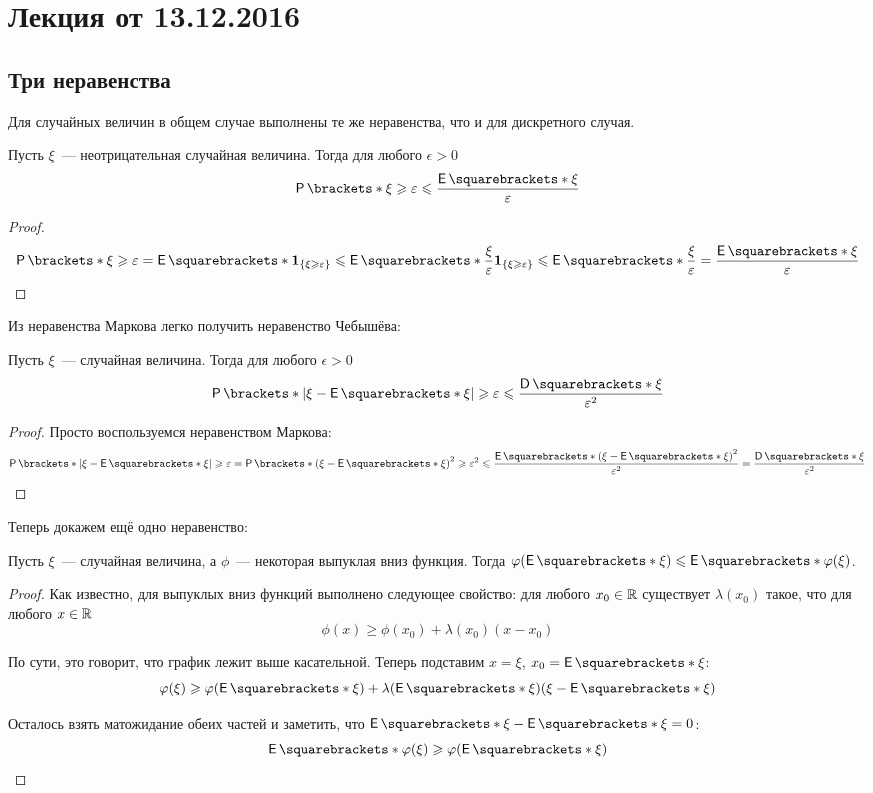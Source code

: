 \section{Лекция от 13.12.2016}
\subsection{Три неравенства}
Для случайных величин в общем случае выполнены те же неравенства, что и для дискретного случая.
\begin{theorem}
	Пусть \(\xi\)~--- неотрицательная случайная величина. Тогда для любого \(\epsilon > 0\)
	\[
		\Pr{\xi \geq \epsilon} \leq \frac{\E{\xi}}{\epsilon}
	\]
\end{theorem}
\begin{proof}
	\[
		\Pr{\xi \geq \epsilon} = \E{\mathbf{1}_{\{\xi \geq \epsilon\}}} \leq \E{\frac{\xi}{\epsilon}\mathbf{1}_{\{\xi \geq \epsilon\}}} \leq \E{\frac{\xi}{\epsilon}} = \frac{\E{\xi}}{\epsilon}\qedhere
	\]
\end{proof}

Из неравенства Маркова легко получить неравенство Чебышёва:
\begin{theorem}
	Пусть \(\xi\)~---  случайная величина. Тогда для любого \(\epsilon > 0\)
	\[
		\Pr{\left|\xi - \E{\xi}\right| \geq \epsilon} \leq \frac{\D{\xi}}{\epsilon^2}
	\]
\end{theorem}
\begin{proof}
	Просто воспользуемся неравенством Маркова:
	\[
		\Pr{\left|\xi - \E{\xi}\right| \geq \epsilon} = \Pr{\left(\xi - \E{\xi}\right)^2 \geq \epsilon^2} \leq \frac{\E{\left(\xi - \E{\xi}\right)^2}}{\epsilon^2} = \frac{\D{\xi}}{\epsilon^2} \qedhere
	\]
\end{proof}

Теперь докажем ещё одно неравенство:
\begin{theorem}
	Пусть \(\xi\)~--- случайная величина, а \(\phi\)~--- некоторая выпуклая вниз функция. Тогда \(\phi(\E{\xi}) \leq \E{\phi(\xi)}\).
\end{theorem}
\begin{proof}
	Как известно, для выпуклых вниз функций выполнено следующее свойство: для любого \(x_0 \in \mathbb{R}\) существует \(\lambda(x_0)\) такое, что для любого \(x \in \mathbb{R}\)
	\[
		\phi(x) \geq \phi(x_0) + \lambda(x_0)(x - x_0)
	\]
	
	По сути, это говорит, что график лежит выше касательной. Теперь подставим \(x = \xi\), \(x_0 = \E{\xi}\):
	\[
		\phi(\xi) \geq \phi(\E{\xi}) + \lambda(\E{\xi})(\xi - \E{\xi})
	\]
	
	Осталось взять матожидание обеих частей и заметить, что \(\E{\xi - \E{\xi}} = 0\):
	\[
		\E{\phi(\xi)} \geq \phi(\E{\xi}) \qedhere
	\]
\end{proof}

